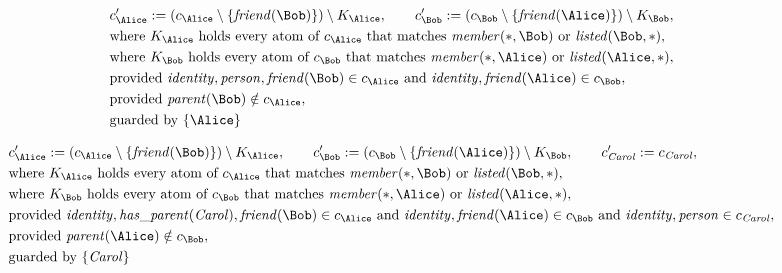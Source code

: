 \begin{align*}
&
c'_
{
\Alice
}
 := 
(c_
{
\Alice
}
 \setminus 
\{
\mathit{\detokenize{
friend
}}
(
\Bob
)
\}
) \setminus K_
{
\Alice
}
, \qquad 
c'_
{
\Bob
}
 := 
(c_
{
\Bob
}
 \setminus 
\{
\mathit{\detokenize{
friend
}}
(
\Alice
)
\}
) \setminus K_
{
\Bob
}
,\\
&
\text{where } K_
{
\Alice
}
 \text{ holds every atom of } c_
{
\Alice
}
 \text{ that matches } 
\mathit{\detokenize{
member
}}
(
\ast
,
\Bob
)
 \text{ or } 
\mathit{\detokenize{
listed
}}
(
\Bob
,
\ast
)
,\\
&
\text{where } K_
{
\Bob
}
 \text{ holds every atom of } c_
{
\Bob
}
 \text{ that matches } 
\mathit{\detokenize{
member
}}
(
\ast
,
\Alice
)
 \text{ or } 
\mathit{\detokenize{
listed
}}
(
\Alice
,
\ast
)
,\\
&
\text{provided } 
\mathit{\detokenize{
identity
}}
,
\mathit{\detokenize{
person
}}
,
\mathit{\detokenize{
friend
}}
(
\Bob
)
 \in c_
{
\Alice
}
 \text{ and } 
\mathit{\detokenize{
identity
}}
,
\mathit{\detokenize{
friend
}}
(
\Alice
)
 \in c_
{
\Bob
}
,\\
&
\text{provided } 
\mathit{\detokenize{
parent
}}
(
\Bob
)
 \notin c_
{
\Alice
}
,\\
&
\text{guarded by } \{
\Alice
\}
\end{align*}

\begin{align*}
&
c'_
{
\Alice
}
 := 
(c_
{
\Alice
}
 \setminus 
\{
\mathit{\detokenize{
friend
}}
(
\Bob
)
\}
) \setminus K_
{
\Alice
}
, \qquad 
c'_
{
\Bob
}
 := 
(c_
{
\Bob
}
 \setminus 
\{
\mathit{\detokenize{
friend
}}
(
\Alice
)
\}
) \setminus K_
{
\Bob
}
, \qquad 
c'_
{
\mathit{Carol}
}
 := 
c_
{
\mathit{Carol}
}
,\\
&
\text{where } K_
{
\Alice
}
 \text{ holds every atom of } c_
{
\Alice
}
 \text{ that matches } 
\mathit{\detokenize{
member
}}
(
\ast
,
\Bob
)
 \text{ or } 
\mathit{\detokenize{
listed
}}
(
\Bob
,
\ast
)
,\\
&
\text{where } K_
{
\Bob
}
 \text{ holds every atom of } c_
{
\Bob
}
 \text{ that matches } 
\mathit{\detokenize{
member
}}
(
\ast
,
\Alice
)
 \text{ or } 
\mathit{\detokenize{
listed
}}
(
\Alice
,
\ast
)
,\\
&
\text{provided } 
\mathit{\detokenize{
identity
}}
,
\mathit{\detokenize{
has_parent
}}
(
\mathit{Carol}
)
,
\mathit{\detokenize{
friend
}}
(
\Bob
)
 \in c_
{
\Alice
}
 \text{ and } 
\mathit{\detokenize{
identity
}}
,
\mathit{\detokenize{
friend
}}
(
\Alice
)
 \in c_
{
\Bob
}
 \text{ and } 
\mathit{\detokenize{
identity
}}
,
\mathit{\detokenize{
person
}}
 \in c_
{
\mathit{Carol}
}
,\\
&
\text{provided } 
\mathit{\detokenize{
parent
}}
(
\Alice
)
 \notin c_
{
\Bob
}
,\\
&
\text{guarded by } \{
\mathit{Carol}
\}
\end{align*}
